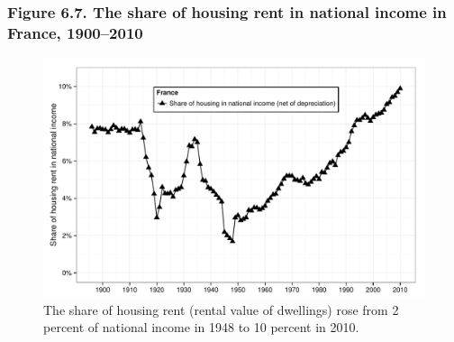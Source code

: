 \documentclass[t]{beamer}\usepackage[]{graphicx}\usepackage[]{color}
\newenvironment{knitrout}{}{} %
\begin{document}
\begin{frame}[label=Figure_6_7]
\frametitle{Figure 6.7. The share of housing rent in national income in France, 1900--2010}
\begin{figure}[t]
\begin{minipage}[b]{\textwidth}
\centering
\begin{knitrout}\footnotesize
{}\color{fgcolor}

{\centering \includegraphics[width=1\linewidth]{figures/bw/Figure_6_7} 

}



\end{knitrout}
\caption{The share of housing rent (rental value of dwellings) rose from 2 percent of national income in 1948 to 10 percent in 2010.}
\end{minipage}
\end{figure}
\end{frame}
\end{document}
